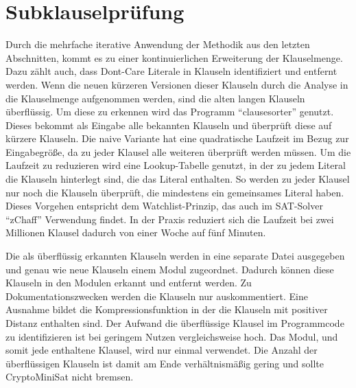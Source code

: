 \section{Subklauselprüfung}
\label{sec:ana:subclauses}

Durch die mehrfache iterative Anwendung der Methodik aus den letzten Abschnitten, kommt es zu einer kontinuierlichen Erweiterung der Klauselmenge.
Dazu zählt auch, dass Dont-Care Literale in Klauseln identifiziert und entfernt werden. Wenn die neuen kürzeren Versionen dieser Klauseln durch die
Analyse in die Klauselmenge aufgenommen werden, sind die alten langen Klauseln überflüssig. Um diese zu erkennen wird das Programm "`clausesorter"'
genutzt. Dieses bekommt als Eingabe alle bekannten Klauseln und überprüft diese auf kürzere Klauseln. Die naive Variante hat eine quadratische
Laufzeit im Bezug zur Eingabegröße, da zu jeder Klausel alle weiteren überprüft werden müssen. Um die Laufzeit zu reduzieren wird eine Lookup-Tabelle
genutzt, in der zu jedem Literal die Klauseln hinterlegt sind, die das Literal enthalten. So werden zu jeder Klausel nur noch die Klauseln überprüft,
die mindestens ein gemeinsames Literal haben. Dieses Vorgehen entspricht dem Watchlist-Prinzip, das auch im SAT-Solver "`zChaff"' \cite{zmmm} Verwendung
findet. In der Praxis reduziert sich die Laufzeit bei zwei Millionen Klausel dadurch von einer Woche auf fünf Minuten.

Die als überflüssig erkannten Klauseln werden in eine separate Datei ausgegeben und genau wie neue Klauseln einem Modul zugeordnet. Dadurch können
diese Klauseln in den Modulen erkannt und entfernt werden. Zu Dokumentationszwecken werden die Klauseln nur auskommentiert. Eine Ausnahme bildet
die Kompressionsfunktion in der die Klauseln mit positiver Distanz enthalten sind. Der Aufwand die überflüssige Klausel im Programmcode zu identifizieren
ist bei geringem Nutzen vergleichsweise hoch. Das Modul, und somit jede enthaltene Klausel, wird nur einmal verwendet. Die Anzahl der überflüssigen
Klauseln ist damit am Ende verhältnismäßig gering und sollte CryptoMiniSat nicht bremsen.
